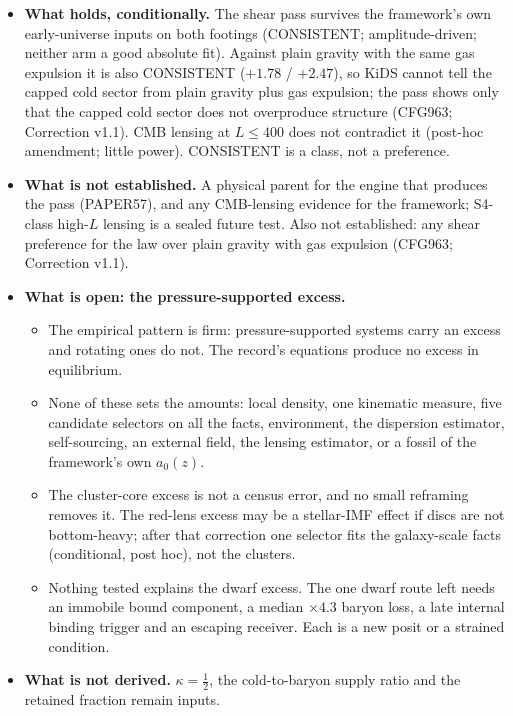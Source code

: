 \documentclass[10pt]{article}
\begin{document}
\begin{itemize}
\item \textbf{What holds, conditionally.} The shear pass survives the framework's own early-universe inputs on both footings (CONSISTENT; amplitude-driven; neither arm a good absolute fit). Against plain gravity with the same gas expulsion it is also CONSISTENT ($+1.78$ / $+2.47$), so KiDS cannot tell the capped cold sector from plain gravity plus gas expulsion; the pass shows only that the capped cold sector does not overproduce structure (CFG963; Correction v1.1). CMB lensing at $L\le400$ does not contradict it (post-hoc amendment; little power). CONSISTENT is a class, not a preference.
\item \textbf{What is not established.} A physical parent for the engine that produces the pass (PAPER57), and any CMB-lensing evidence for the framework; S4-class high-$L$ lensing is a sealed future test. Also not established: any shear preference for the law over plain gravity with gas expulsion (CFG963; Correction v1.1).
\item \textbf{What is open: the pressure-supported excess.}
  \begin{itemize}
  \item The empirical pattern is firm: pressure-supported systems carry an excess and rotating ones do not. The record's equations produce no excess in equilibrium.
  \item None of these sets the amounts: local density, one kinematic measure, five candidate selectors on all the facts, environment, the dispersion estimator, self-sourcing, an external field, the lensing estimator, or a fossil of the framework's own $a_0(z)$.
  \item The cluster-core excess is not a census error, and no small reframing removes it. The red-lens excess may be a stellar-IMF effect if discs are not bottom-heavy; after that correction one selector fits the galaxy-scale facts (conditional, post hoc), not the clusters.
  \item Nothing tested explains the dwarf excess. The one dwarf route left needs an immobile bound component, a median $\times4.3$ baryon loss, a late internal binding trigger and an escaping receiver. Each is a new posit or a strained condition.
  \end{itemize}
\item \textbf{What is not derived.} $\kappa=\tfrac12$, the cold-to-baryon supply ratio and the retained fraction remain inputs.
\end{itemize}
\end{document}

